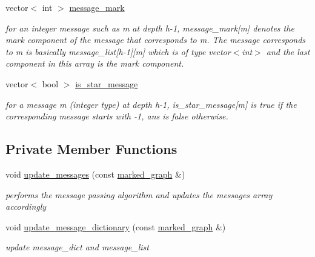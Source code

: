 \begin{DoxyCompactItemize}
vector$<$ int $>$ \hyperlink{classgraph__message_a49d9af5150daf0599c29fe18cb032fa5}{message\+\_\+mark}
\begin{DoxyCompactList}\small\item\em for an integer message such as m at depth h-\/1, message\+\_\+mark\mbox{[}m\mbox{]} denotes the mark component of the message that corresponds to m. The message corresponds to m is basically message\+\_\+list\mbox{[}h-\/1\mbox{]}\mbox{[}m\mbox{]} which is of type vector$<$int$>$ and the last component in this array is the mark component. \end{DoxyCompactList}\item 
vector$<$ bool $>$ \hyperlink{classgraph__message_a55ff5531a0043106369e84a7bc45e22d}{is\+\_\+star\+\_\+message}
\begin{DoxyCompactList}\small\item\em for a message m (integer type) at depth h-\/1, is\+\_\+star\+\_\+message\mbox{[}m\mbox{]} is true if the corresponding message starts with -\/1, ans is false otherwise. \end{DoxyCompactList}\end{DoxyCompactItemize}
\subsection*{Private Member Functions}
\begin{DoxyCompactItemize}
\item 
void \hyperlink{classgraph__message_a40dadc59d582b290202e79bc4a9e896c}{update\+\_\+messages} (const \hyperlink{classmarked__graph}{marked\+\_\+graph} \&)
\begin{DoxyCompactList}\small\item\em performs the message passing algorithm and updates the messages array accordingly \end{DoxyCompactList}\item 
void \hyperlink{classgraph__message_a77d137b371134e292283fdd78634f4d4}{update\+\_\+message\+\_\+dictionary} (const \hyperlink{classmarked__graph}{marked\+\_\+graph} \&)
\begin{DoxyCompactList}\small\item\em update message\+\_\+dict and message\+\_\+list \end{DoxyCompactList}\end{DoxyCompactItemize}

